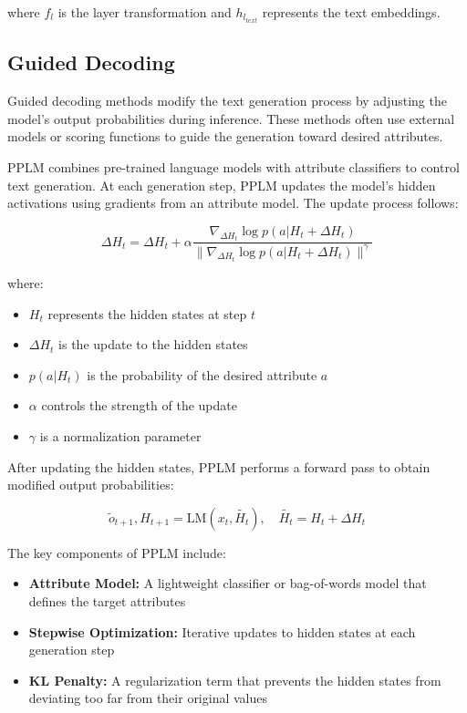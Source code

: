where $f_l$ is the layer transformation and $h_{l_{text}}$ represents the text embeddings.

\subsection{Guided Decoding}

Guided decoding methods modify the text generation process by adjusting the model's output probabilities during inference. These methods often use external models or scoring functions to guide the generation toward desired attributes.

PPLM combines pre-trained language models with attribute classifiers to control text generation. At each generation step, PPLM updates the model's hidden activations using gradients from an attribute model. The update process follows:

\begin{equation}
    \Delta H_t = \Delta H_t + \alpha \frac{\nabla_{\Delta H_t} \log p(a|H_t + \Delta H_t)}{\|\nabla_{\Delta H_t} \log p(a|H_t + \Delta H_t)\|^\gamma}
\end{equation}

where:
\begin{itemize}
    \item $H_t$ represents the hidden states at step $t$
    \item $\Delta H_t$ is the update to the hidden states
    \item $p(a|H_t)$ is the probability of the desired attribute $a$
    \item $\alpha$ controls the strength of the update
    \item $\gamma$ is a normalization parameter
\end{itemize}

After updating the hidden states, PPLM performs a forward pass to obtain modified output probabilities:

\begin{equation}
    \tilde{o}_{t+1}, H_{t+1} = \text{LM}(x_t, \tilde{H_t}), \quad \tilde{H_t} = H_t + \Delta H_t
\end{equation}

The key components of PPLM include:

\begin{itemize}
    \item \textbf{Attribute Model:} A lightweight classifier or bag-of-words model that defines the target attributes
    
    \item \textbf{Stepwise Optimization:} Iterative updates to hidden states at each generation step
    
    \item \textbf{KL Penalty:} A regularization term that prevents the hidden states from deviating too far from their original values
\end{itemize}

